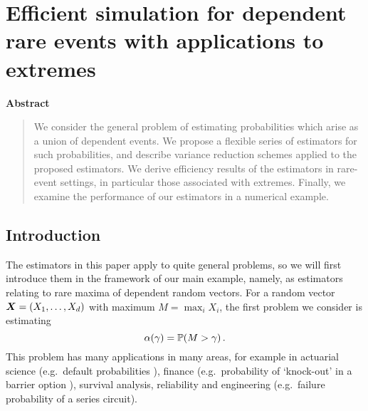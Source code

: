\chapter{Efficient simulation for dependent rare events with applications to extremes}


\begin{center}
\textbf{Abstract}
\end{center}
\begin{quote}
We consider the general problem of estimating probabilities which arise as
a union of dependent events. We propose a flexible series of
estimators for such probabilities, and describe variance reduction schemes applied
to the proposed estimators. We derive efficiency results of the estimators in  rare-event settings, in particular those associated with extremes. Finally, we examine the performance of our estimators in a numerical example.
\end{quote}



\section{Introduction}

The estimators in this paper apply to quite general problems, so we will first introduce them in the framework of our main example, namely, as estimators relating to rare maxima of dependent random vectors.  
For a random vector $\bm{X} = (X_1, \dots, X_d)$ with maximum $M = \max_i X_i$, the first problem we consider is estimating 
\[ \alpha(\gamma) = \operatorname{{\mathbb P}}(M > \gamma) \,. \] 
This problem has many applications in many areas, for example in actuarial science (e.g.\ default probabilities \cite{asmussen2010ruin}), finance (e.g.\ probability of `knock-out' in a barrier option \cite{cont2010encyclopedia}), survival analysis, reliability \cite{rausand2004system} and engineering (e.g.\ failure probability of a series circuit).

